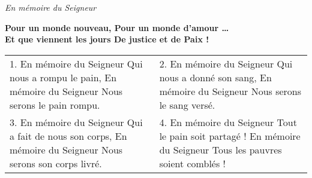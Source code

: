 \emph{En mémoire du Seigneur}

\textbf{
Pour un monde nouveau,
Pour un monde d’amour \dots \\
Et que viennent les jours
De justice et de Paix !
}

\begin{tabular}{p{} p{}}
1.
En mémoire du Seigneur \newline
Qui nous a rompu le pain, \newline
En mémoire du Seigneur \newline
Nous serons le pain rompu.
&
2.
En mémoire du Seigneur \newline
Qui nous a donné son sang, \newline
En mémoire du Seigneur \newline
Nous serons le sang versé.
\\
3.
En mémoire du Seigneur \newline
Qui a fait de nous son corps, \newline
En mémoire du Seigneur \newline
Nous serons son corps livré.
&
4.
En mémoire du Seigneur \newline
Tout le pain soit partagé ! \newline
En mémoire du Seigneur \newline
Tous les pauvres soient comblés ! 
\end{tabular}
